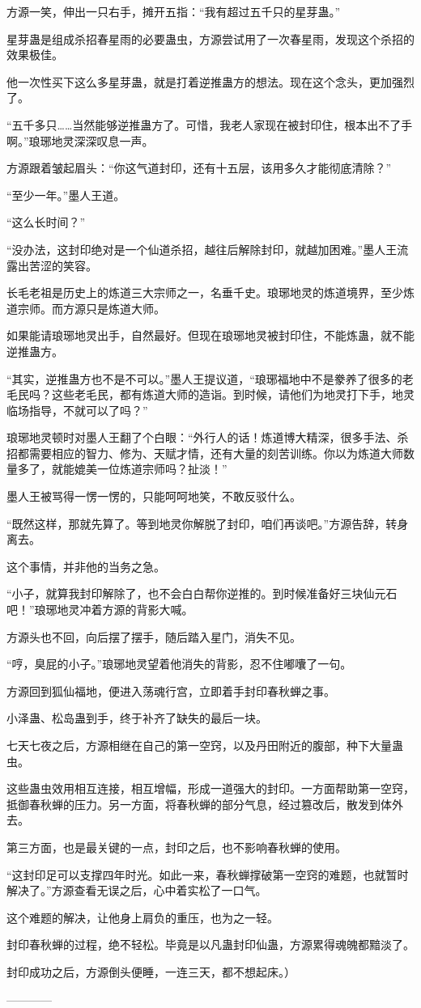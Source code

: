 \begin{this_body}
方源一笑，伸出一只右手，摊开五指：“我有超过五千只的星芽蛊。”

星芽蛊是组成杀招春星雨的必要蛊虫，方源尝试用了一次春星雨，发现这个杀招的效果极佳。

他一次性买下这么多星芽蛊，就是打着逆推蛊方的想法。现在这个念头，更加强烈了。

“五千多只……当然能够逆推蛊方了。可惜，我老人家现在被封印住，根本出不了手啊。”琅琊地灵深深叹息一声。

方源跟着皱起眉头：“你这气道封印，还有十五层，该用多久才能彻底清除？”

“至少一年。”墨人王道。

“这么长时间？”

“没办法，这封印绝对是一个仙道杀招，越往后解除封印，就越加困难。”墨人王流露出苦涩的笑容。

长毛老祖是历史上的炼道三大宗师之一，名垂千史。琅琊地灵的炼道境界，至少炼道宗师。而方源只是炼道大师。

如果能请琅琊地灵出手，自然最好。但现在琅琊地灵被封印住，不能炼蛊，就不能逆推蛊方。

“其实，逆推蛊方也不是不可以。”墨人王提议道，“琅琊福地中不是豢养了很多的老毛民吗？这些老毛民，都有炼道大师的造诣。到时候，请他们为地灵打下手，地灵临场指导，不就可以了吗？”

琅琊地灵顿时对墨人王翻了个白眼：“外行人的话！炼道博大精深，很多手法、杀招都需要相应的智力、修为、天赋才情，还有大量的刻苦训练。你以为炼道大师数量多了，就能媲美一位炼道宗师吗？扯淡！”

墨人王被骂得一愣一愣的，只能呵呵地笑，不敢反驳什么。

“既然这样，那就先算了。等到地灵你解脱了封印，咱们再谈吧。”方源告辞，转身离去。

这个事情，并非他的当务之急。

“小子，就算我封印解除了，也不会白白帮你逆推的。到时候准备好三块仙元石吧！”琅琊地灵冲着方源的背影大喊。

方源头也不回，向后摆了摆手，随后踏入星门，消失不见。

“哼，臭屁的小子。”琅琊地灵望着他消失的背影，忍不住嘟囔了一句。

方源回到狐仙福地，便进入荡魂行宫，立即着手封印春秋蝉之事。

小泽蛊、松岛蛊到手，终于补齐了缺失的最后一块。

七天七夜之后，方源相继在自己的第一空窍，以及丹田附近的腹部，种下大量蛊虫。

这些蛊虫效用相互连接，相互增幅，形成一道强大的封印。一方面帮助第一空窍，抵御春秋蝉的压力。另一方面，将春秋蝉的部分气息，经过篡改后，散发到体外去。

第三方面，也是最关键的一点，封印之后，也不影响春秋蝉的使用。

“这封印足可以支撑四年时光。如此一来，春秋蝉撑破第一空窍的难题，也就暂时解决了。”方源查看无误之后，心中着实松了一口气。

这个难题的解决，让他身上肩负的重压，也为之一轻。

封印春秋蝉的过程，绝不轻松。毕竟是以凡蛊封印仙蛊，方源累得魂魄都黯淡了。

封印成功之后，方源倒头便睡，一连三天，都不想起床。）

------------

\end{this_body}

